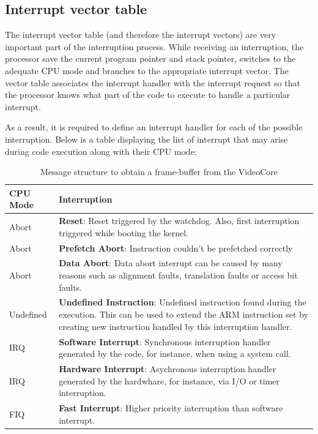 \subsection{Interrupt vector table}
The interrupt vector table (and therefore the interrupt vectors) are very important part of the interruption process. While receiving an interruption, the processor save the current program pointer and stack pointer, switches to the adequate CPU mode and branches to the appropriate interrupt vector. The vector table associates the interrupt handler with the interrupt request so that the processor knows what part of the code to execute to handle a particular interrupt.

As a result, it is required to define an interrupt handler for each of the possible interruption. Below is a table displaying the list of interrupt that may arise during code execution along with their CPU mode:

\begin{table}[H]
    \centering
    \begin{tabular}{| p{3cm} | p{7cm} |}
    \hline
    \textbf{CPU Mode}	&  \textbf{Interruption} \\ \hline
    Abort              &  \textbf{Reset}: Reset triggered by the watchdog. Also, first interruption triggered while booting the kernel. \\ \hline
    Abort              &  \textbf{Prefetch Abort}: Instruction couldn't be prefetched correctly \\ \hline
    Abort              &  \textbf{Data Abort}: Data abort interrupt can be caused by many reasons such as alignment faults, translation faults or access bit faults. \\ \hline
    Undefined          &  \textbf{Undefined Instruction}: Undefined instruction found during the execution. This can be used to extend the ARM instruction set by creating new instruction handled by this interruption handler. \\ \hline
    IRQ 				&  \textbf{Software Interrupt}: Synchronous interruption handler generated by the code, for instance, when using a system call. \\ \hline
    IRQ                &  \textbf{Hardware Interrupt}: Asychronous interruption handler generated by the hardwhare, for instance, via I/O or timer interruption. \\ \hline
    FIQ                &  \textbf{Fast Interrupt}: Higher priority interruption than software interrupt.\\ \hline
    \end{tabular}
    \caption{Message structure to obtain a frame-buffer from the VideoCore}
\end{table}


